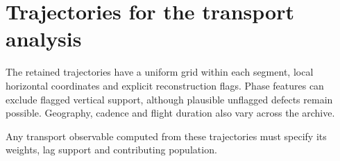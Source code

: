 \FloatBarrier

\section{Trajectories for the transport analysis}

The retained trajectories have a uniform grid within each segment, local horizontal
coordinates and explicit reconstruction flags. Phase features can exclude flagged
vertical support, although plausible unflagged defects remain possible.
Geography, cadence and flight duration also vary across the archive.

Any transport observable computed from these trajectories must specify its
weights, lag support and contributing population.

